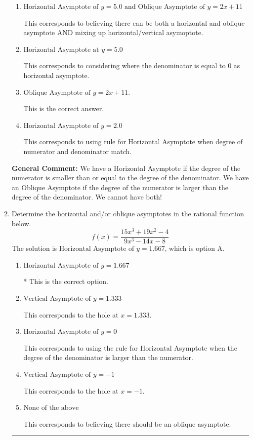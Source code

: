 \documentclass{extbook}[14pt]
\newcommand{\litem}[1]{\item #1

\rule{\textwidth}{0.4pt}}
\begin{document}
\begin{enumerate}
{\begin{enumerate}[label=\Alph*.]
This corresponds to believing there can be both a horizontal and oblique asymptote.
\item \( \text{Horizontal Asymptote of } y = 5.0 \text{ and Oblique Asymptote of } y = 2x + 11 \)

This corresponds to believing there can be both a horizontal and oblique asymptote AND mixing up horizontal/vertical asymoptote.
\item \( \text{Horizontal Asymptote at } y = 5.0 \)

This corresponds to considering where the denominator is equal to 0 as horizontal asymptote.
\item \( \text{Oblique Asymptote of } y = 2x + 11. \)

This is the correct answer.
\item \( \text{Horizontal Asymptote of } y = 2.0  \)

This corresponds to using rule for Horizontal Asymptote when degree of numerator and denominator match.
\end{enumerate}

\textbf{General Comment:} We have a Horizontal Asymptote if the degree of the numerator is smaller than or equal to the degree of the denominator. We have an Oblique Asymptote if the degree of the numerator is larger than the degree of the denominator. We cannot have both!
}
\litem{
Determine the horizontal and/or oblique asymptotes in the rational function below.
\[ f(x) = \frac{15x^{3} +19 x^{2} -4}{9x^{3} -14 x -8} \]The solution is \( \text{Horizontal Asymptote of } y = 1.667  \), which is option A.\begin{enumerate}[label=\Alph*.]
\item \( \text{Horizontal Asymptote of } y = 1.667  \)

* This is the correct option.
\item \( \text{Vertical Asymptote of } y = 1.333  \)

This corresponds to the hole at $x = 1.333$.
\item \( \text{Horizontal Asymptote of } y = 0  \)

This corresponds to using the rule for Horizontal Asymptote when the degree of the denominator is larger than the numerator.
\item \( \text{Vertical Asymptote of } y = -1  \)

This corresponds to the hole at $x = -1$.
\item \( \text{None of the above} \)

This corresponds to believing there should be an oblique asymptote.
\end{enumerate}

}
\end{enumerate}
\end{document}
